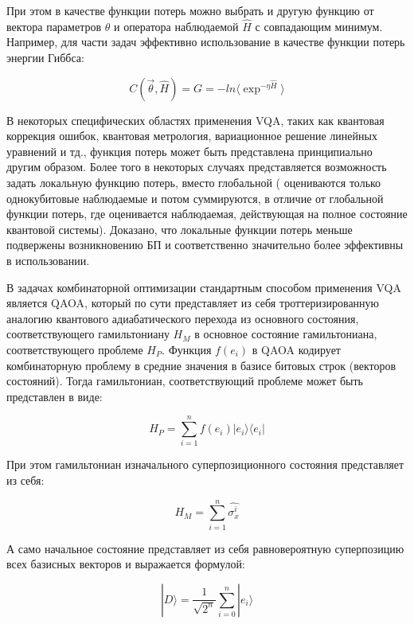 \documentclass[12pt]{extarticle}
\begin{document}
\qquad При этом в качестве функции потерь можно выбрать и другую функцию от вектора параметров $\theta$ и оператора наблюдаемой $\hat H$ с совпадающим минимум. Например, для части задач эффективно использование в качестве функции потерь энергии Гиббса:

\begin{equation}
 C( \vec \theta, \hat H ) = G = -ln \langle \exp^{-\eta \hat H} \rangle
\end{equation} 

\qquad В некоторых специфических областях применения VQA, таких как квантовая коррекция ошибок, квантовая метрология, вариационное решение линейных уравнений и тд., функция потерь может быть представлена принципиально другим образом. Более того в некоторых случаях представляется возможность задать локальную функцию потерь, вместо глобальной ( оцениваются только однокубитовые наблюдаемые и потом суммируются, в отличие от глобальной функции потерь, где оценивается наблюдаемая, действующая на полное состояние квантовой системы). Доказано, что локальные функции потерь меньше подвержены возникновению БП и соответственно значительно более эффективны в использовании.

\qquad В задачах комбинаторной оптимизации стандартным способом применения VQA является QAOA, который по сути представляет из себя троттеризированную аналогию квантового адиабатического перехода из основного состояния, соответствующего гамильтониану $H_{M}$ в основное состояние гамильтониана, соответствующего проблеме $H_{P}$. Функция $f(e_{i})$ в QAOA кодирует комбинаторную проблему в средние значения в базисе битовых строк (векторов состояний). Тогда гамильтониан, соответствующий проблеме может быть представлен в виде:
 

\begin{equation}
H_{P} = \sum^{n}_{i=1} f(e_{i}) | e_{i} \rangle \langle e_{i} |
\end{equation}

\qquad При этом гамильтониан изначального суперпозиционного состояния представляет из себя:

\begin{equation}
H_{M} = \sum^{n}_{i=1} \hat{ \sigma^{i}_{x} }
\end{equation}

\qquad А само начальное состояние представляет из себя равновероятную суперпозицию всех базисных векторов и выражается формулой:

\begin{equation}
|D \rangle = \frac{1}{\sqrt{2^{n}}} \sum^{n}_{i = 0} |e_{i} \rangle
\end{equation}
\end{document}
